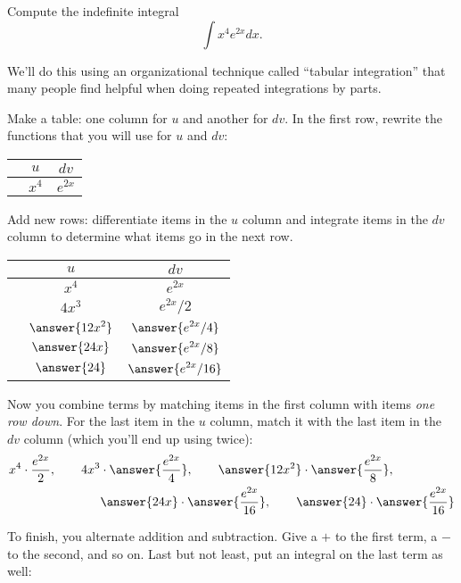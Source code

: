 \documentclass{ximera}
\begin{document}
\begin{example}
Compute the indefinite integral
\[ \int x^4 e^{2x} dx. \]
\begin{itemize}
\item We'll do this using an organizational technique called ``tabular integration'' that many people find helpful when doing repeated integrations by parts.
\item Make a table: one column for $u$ and another for $dv$. In the first row, rewrite the functions that you will use for $u$ and $dv$:
\begin{center}
\begin{tabular}{ccc}
 & $u$ & $dv$ \\
 \hline
& $\displaystyle x^4$ & $\displaystyle e^{2x}$ 
\end{tabular}
\end{center}
\item Add new rows: differentiate items in the $u$ column and integrate items in the $dv$ column to determine what items go in the next row. 
\begin{center}
\begin{tabular}{ccc}
 & $u$ & $dv$ \\
 \hline
& $\displaystyle x^4$ & $\displaystyle e^{2x}$ \\
& $\displaystyle 4 x^3$ & $\displaystyle e^{2x}/2$ \\
& $\displaystyle \answer{12 x^2}$ & $\displaystyle \answer{e^{2x}/4}$ \\
& $\displaystyle \answer{24 x}$ & $\displaystyle \answer{e^{2x}/8}$ \\
& $\displaystyle \answer{24}$ & $\displaystyle  \answer{e^{2x}/16}$ \\
\end{tabular}
\item Now you combine terms by matching items in the first column with items \textit{one row down}. For the last item in the $u$ column, match it with the last item in the $dv$ column (which you'll end up using twice):
\[ \begin{aligned} x^4 \cdot \frac{e^{2x}}{2}, \qquad {4 x^3} & \cdot \answer{\frac{e^{2x}}{4}}, \qquad \answer{12 x^2} \cdot \answer{\frac{e^{2x}}{8}}, \\  & \answer{24 x}  \cdot \answer{\frac{e^{2x}}{16}}, \qquad \answer{24} \cdot \answer{\frac{e^{2x}}{16}} \end{aligned} \]
\end{center}
\item To finish, you alternate addition and subtraction. Give a $+$ to the first term, a $-$ to the second, and so on. Last but not least, put an integral on the last term as well:

\end{itemize}
\end{example}
\end{document}
